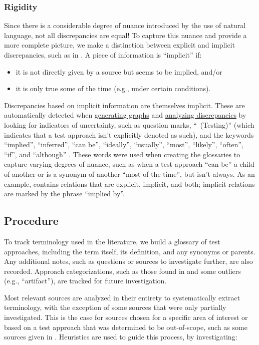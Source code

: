 \subsubsection{Rigidity}
\label{rigidity}

Since there is a considerable degree of nuance introduced by the use of natural
language, not all discrepancies are equal! To capture this nuance and provide a
more complete picture, we make a distinction between explicit and implicit
discrepancies, such as in . A piece of
information is ``implicit'' if:
\begin{itemize}
    \item it is not directly given by a source but seems to be implied, and/or
    \item it is only true some of the time (e.g., under certain conditions).
\end{itemize}
Discrepancies based on implicit information are themselves implicit. These are
automatically detected when \hyperref[graph-gen]{generating graphs} and
\hyperref[discrep-analysis]{analyzing discrepancies} by looking for indicators
of uncertainty, such as question marks, ``~(Testing)'' (which indicates
that a test approach isn't explicitly denoted as such), and the keywords
``implied'', ``inferred'', ``can be'', ``ideally'', ``usually'', ``most'',
``likely'', ``often'', ``if'', and ``although''
. These words were used when creating
the glossaries to capture varying degrees of nuance, such as when a test
approach ``can be'' a child of another or is a synonym of another ``most of the
time'', but isn't always. As an example,  contains relations
that are explicit, implicit, and both; implicit relations are marked by the
phrase ``implied by''.

\subsection{Procedure}

To track terminology used in the literature, we build a glossary of test
approaches, including the term itself, its definition, and
any synonyms or parents. Any additional notes, such as questions or sources to investigate
further, are also recorded. Approach categorizations, such as those found in
 and some outliers (e.g., ``artifact''), are tracked
for future investigation.

Most relevant sources are analyzed in their entirety to systematically extract
terminology, with the exception of some sources that were only partially
investigated. This is the case for sources chosen for a specific area of
interest or based on a test approach that was determined to be out-of-scope,
such as some sources given in .
Heuristics are used to guide this process, by investigating:

